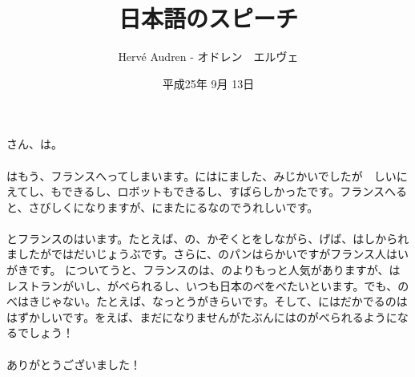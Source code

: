 \documentclass[a4paper,12pt]{article}
\begin{document}
\begin{CJK}{UTF8}{min}

\author{Herv\'e Audren - オドレン　エルヴェ}
\title{日本語のスピーチ}
\date{平成25年 9月 13日}
\maketitle
\paragraph*{}さん、は。
\paragraph*{}はもう、フランスへってしまいます。にはにました、みじかいでしたが　しいにえてし、もできるし、ロボットもできるし、すばらしかったです。フランスへると、さびしくになりますが、にまたにるなのでうれしいです。

\paragraph*{}とフランスのはいます。たとえば、の、かぞくとをしながら、げば、はしかられましたがではだいじょうぶです。さらに、のパンはらかいですがフランス人はいがきです。
についてうと、フランスのは、のよりもっと人気がありますが、はレストランがいし、がべられるし、いつも日本のべをべたいといます。でも、のべはきじゃない。たとえば、なっとうがきらいです。そして、にはだかでるのははずかしいです。をえば、まだになりませんがたぶんにはのがべられるようになるでしょう！

\paragraph*{}ありがとうございました！

\end{CJK}
\end{document}
